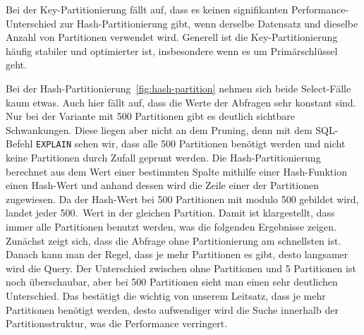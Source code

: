 Bei der Key-Partitionierung fällt auf, dass es keinen signifikanten Performance-Unterschied zur Hash-Partitionierung gibt, wenn derselbe Datensatz und dieselbe Anzahl von Partitionen verwendet wird.
Generell ist die Key-Partitionierung häufig stabiler und optimierter ist, insbesondere wenn es um Primärschlüssel geht.

Bei der Hash-Partitionierung~\ref{fig:hash-partition} nehmen sich beide Select-Fälle kaum etwas.
Auch hier fällt auf, dass die Werte der Abfragen sehr konstant sind.
Nur bei der Variante mit 500 Partitionen gibt es deutlich sichtbare Schwankungen.
Diese liegen aber nicht an dem Pruning, denn mit dem SQL-Befehl \texttt{EXPLAIN} sehen wir, dass alle 500 Partitionen benötigt werden und nicht keine Partitionen durch Zufall geprunt werden.
Die Hash-Partitionierung berechnet aus dem Wert einer bestimmten Spalte mithilfe einer Hash-Funktion einen Hash-Wert und anhand dessen wird die Zeile einer der Partitionen zugewiesen.
Da der Hash-Wert bei 500 Partitionen mit modulo 500 gebildet wird, landet jeder 500.\ Wert in der gleichen Partition.
Damit ist klargestellt, dass immer alle Partitionen benutzt werden, was die folgenden Ergebnisse zeigen.
Zunächst zeigt sich, dass die Abfrage ohne Partitionierung am schnellsten ist.
Danach kann man der Regel, dass je mehr Partitionen es gibt, desto langsamer wird die Query.
Der Unterschied zwischen ohne Partitionen und 5 Partitionen ist noch überschaubar, aber bei 500 Partitionen sieht man einen sehr deutlichen Unterschied.
Das bestätigt die wichtig von unserem Leitsatz, dass je mehr Partitionen benötigt werden, desto aufwendiger wird die Suche innerhalb der Partitionsstruktur, was die Performance verringert.

